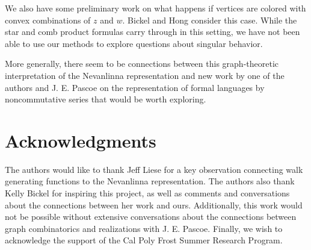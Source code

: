 \documentclass[12pt]{amsart}
\theoremstyle{remark}
\numberwithin{equation}{section}
\begin{document}
We also have some preliminary work on what happens if vertices are colored with convex combinations of $z$ and $w$. Bickel and Hong consider this case. While the star and comb product formulas carry through in this setting, we have not been able to use our methods to explore questions about singular behavior.

More generally, there seem to be connections between this graph-theoretic interpretation of the Nevanlinna representation and new work by one of the authors and J. E. Pascoe on the representation of formal languages by noncommutative series \cite{combconv} that would be worth exploring.

\section*{Acknowledgments}

The authors would like to thank Jeff Liese for a key observation connecting walk generating functions to the Nevanlinna representation. The authors also thank Kelly Bickel for inspiring this project, as well as comments and conversations about the connections between her work and ours. Additionally, this work would not be possible without extensive conversations about the connections between graph combinatorics and realizations with J. E. Pascoe. Finally, we wish to acknowledge the support of the Cal Poly Frost Summer Research Program.



\end{document}
